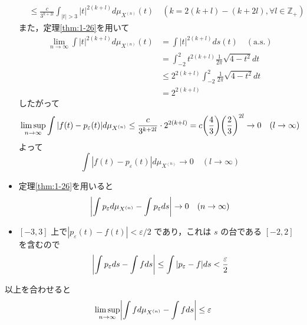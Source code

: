 \documentclass{ltjsarticle}
\makeatletter
\theoremstyle{mystyle1}
\theoremstyle{mystyle2}
\theoremstyle{mystyle3}
\renewenvironment{proof}[1][\proofname]{\par
  \pushQED{\qed}%
  \normalfont
  \topsep6\p@\@plus6\p@ \trivlist
  \item[\hskip\labelsep{\bfseries\sffamily #1}]\ignorespaces
}{%
  \popQED\endtrivlist\@endpefalse
}
\renewcommand\proofname{証明}
\makeatother
\begin{document}
\begin{proof}
\begin{itemize}
\begin{equation}
\begin{split}
                      & \leq \frac{c}{3^{k+2l}}\int_{|t|>3}|t|^{2(k+l)}d\mu_{X^{(n)}}(t)\quad (k=2(k+l)-(k+2l),\forall l\in\mathbb{Z}_+)
                  \end{split}
              \end{equation}
              また，定理\ref{thm:1-26}を用いて
              \begin{equation}
                  \begin{split}
                      \lim_{n\to\infty}\int |t|^{2(k+l)}d\mu_{X^{(n)}}(t)
                      & =\int |t|^{2(k+l)}ds(t)\quad(\mathrm{a.s.})             \\
                      & =\int_{-2}^2t^{2(k+l)}\frac{1}{2\pi}\sqrt{4-t^2}dt      \\
                      & \leq  2^{2(k+l)}\int_{-2}^2\frac{1}{2\pi}\sqrt{4-t^2}dt \\
                      & =2^{2(k+l)}
                  \end{split}
              \end{equation}
              したがって
              \begin{equation}
                  \limsup_{n\to\infty}\int |f(t)-p_\varepsilon(t)|d\mu_{X^{(n)}}\leq \frac{c}{3^{k+2l}}\cdot 2^{2(k+l)}=c\mleft(\frac{4}{3}\mright)\mleft(\frac{2}{3}\mright)^{2l}\to 0\quad (l\to\infty)
              \end{equation}
              よって
              \begin{equation}
                  \int |f(t)-p_\varepsilon(t)|d\mu_{X^{(n)}}\to 0\quad (l\to\infty)
              \end{equation}
        \item 定理\ref{thm:1-26}を用いると
              \begin{equation}
                  \mleft|\int p_\varepsilon d\mu_{X^{(n)}}-\int p_\varepsilon ds\mright|\to 0\quad (n\to\infty)
              \end{equation}
        \item $[-3,3]$ 上で$|p_\varepsilon(t)-f(t)|<\varepsilon/2$ であり，これは $s$ の台である $[-2,2]$ を含むので
              \begin{equation}
                  \mleft|\int p_\varepsilon ds - \int f ds\mright|\leq \int |p_\varepsilon - f|ds < \frac{\varepsilon}{2}
              \end{equation}
    \end{itemize}
    以上を合わせると
    \begin{equation}
        \limsup_{n\to\infty}\mleft|\int f d\mu_{X^{(n)}}-\int f ds\mright|\leq\varepsilon

\end{equation}
\end{proof}
\end{document}
